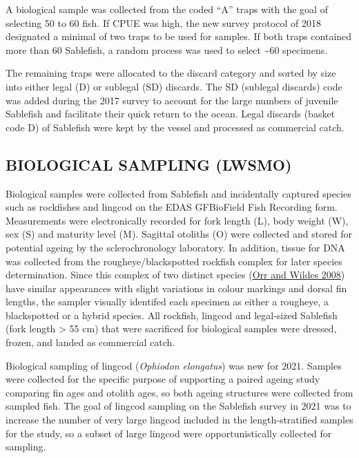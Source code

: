 \documentclass[12pt]{article}\usepackage[]{graphicx}\usepackage[]{color}
\begin{document}
A biological sample was collected from the coded ``A'' traps with the goal of selecting 50 to 60 fish. If CPUE was high, the new survey protocol of 2018 designated a minimal of two traps to be used for samples. If both traps contained more than 60 Sablefish, a random process was used to select \textasciitilde60 specimens.

The remaining traps were allocated to the discard category and sorted by size into either legal (D) or sublegal (SD) discards. The SD (sublegal discards) code was added during the 2017 survey to account for the large numbers of juvenile Sablefish and facilitate their quick return to the ocean. Legal discards (basket code D) of Sablefish were kept by the vessel and processed as commercial catch.

\hypertarget{biological-sampling-lwsmo}{%
\subsection{BIOLOGICAL SAMPLING (LWSMO)}\label{biological-sampling-lwsmo}}

Biological samples were collected from Sablefish and incidentally captured species such as rockfishes and lingcod on the EDAS GFBioField Fish Recording form. Measurements were electronically recorded for fork length (L), body weight (W), sex (S) and maturity level (M). Sagittal otoliths (O) were collected and stored for potential ageing by the sclerochronology laboratory. In addition, tissue for DNA was collected from the rougheye/blackspotted rockfish complex for later species determination. Since this complex of two distinct species (\protect\hyperlink{ref-Orr2008}{Orr and Wildes 2008}) have similar appearances with slight variations in colour markings and dorsal fin lengths, the sampler visually identifed each specimen as either a rougheye, a blackspotted or a hybrid species. All rockfish, lingcod and legal-sized Sablefish (fork length \textgreater{} 55 cm) that were sacrificed for biological samples were dressed, frozen, and landed as commercial catch.

Biological sampling of lingcod (\emph{Ophiodon elongatus}) was new for 2021. Samples were collected for the specific purpose of supporting a paired ageing study comparing fin ages and otolith ages, so both ageing structures were collected from sampled fish. The goal of lingcod sampling on the Sablefish survey in 2021 was to increase the number of very large lingcod included in the length-stratified samples for the study, so a subset of large lingcod were opportunistically collected for sampling.
\end{document}
